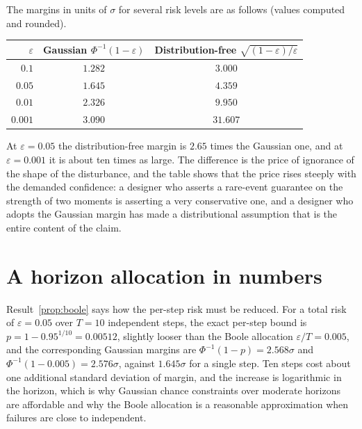The margins in units of $\sigma$ for several risk levels are as follows (values computed and rounded).
\begin{center}
\begin{tabular}{rcc}
\toprule
$\varepsilon$ & Gaussian $\Phi^{-1}(1-\varepsilon)$ & Distribution-free $\sqrt{(1-\varepsilon)/\varepsilon}$\\
\midrule
$0.1$ & $1.282$ & $3.000$\\
$0.05$ & $1.645$ & $4.359$\\
$0.01$ & $2.326$ & $9.950$\\
$0.001$ & $3.090$ & $31.607$\\
\bottomrule
\end{tabular}
\end{center}
At $\varepsilon=0.05$ the distribution-free margin is $2.65$ times the Gaussian one, and at $\varepsilon=0.001$ it is about ten times as large. The difference is the price of ignorance of the shape of the disturbance, and the table shows that the price rises steeply with the demanded confidence: a designer who asserts a rare-event guarantee on the strength of two moments is asserting a very conservative one, and a designer who adopts the Gaussian margin has made a distributional assumption that is the entire content of the claim.

\section{A horizon allocation in numbers}\label{sec:horizon-numbers}

Result~\ref{prop:boole} says how the per-step risk must be reduced. For a total risk of $\varepsilon=0.05$ over $T=10$ independent steps, the exact per-step bound is $p=1-0.95^{1/10}=0.00512$, slightly looser than the Boole allocation $\varepsilon/T=0.005$, and the corresponding Gaussian margins are $\Phi^{-1}(1-p)=2.568\sigma$ and $\Phi^{-1}(1-0.005)=2.576\sigma$, against $1.645\sigma$ for a single step. Ten steps cost about one additional standard deviation of margin, and the increase is logarithmic in the horizon, which is why Gaussian chance constraints over moderate horizons are affordable and why the Boole allocation is a reasonable approximation when failures are close to independent.

